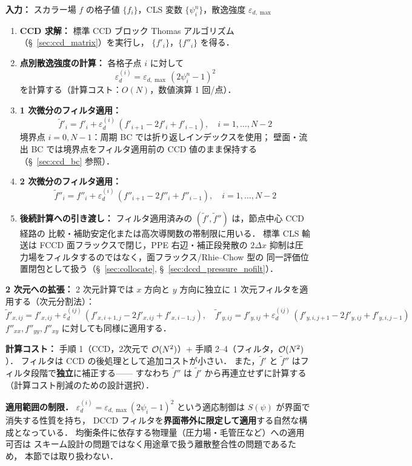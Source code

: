\begin{tcolorbox}[algbox, title={適応 Dissipative-CCD フィルタの節点中心評価手順}]
\label{alg:dccd}
\textbf{入力：} スカラー場 $f$ の格子値 $\{f_i\}$，CLS 変数 $\{\psi_i^n\}$，散逸強度 $\varepsilon_{d,\max}$

\begin{enumerate}
  \item \textbf{CCD 求解：}
        標準 CCD ブロック Thomas アルゴリズム（§~\ref{sec:ccd_matrix}）を実行し，
        $\{f'_i\}$，$\{f''_i\}$ を得る．
  \item \textbf{点別散逸強度の計算：}
        各格子点 $i$ に対して
        \[
          \varepsilon_d^{(i)} = \varepsilon_{d,\max}\,(2\psi_i^n - 1)^2
        \]
        を計算する（計算コスト：$O(N)$，数値演算 1 回/点）．
  \item \textbf{1 次微分のフィルタ適用：}
        \[
          \tilde{f}'_i = f'_i + \varepsilon_d^{(i)}\,(f'_{i+1} - 2f'_i + f'_{i-1}),
          \quad i = 1, \ldots, N-2
        \]
        境界点 $i=0, N-1$：周期 BC では折り返しインデックスを使用；
        壁面・流出 BC では境界点をフィルタ適用前の CCD 値のまま保持する（§~\ref{sec:ccd_bc} 参照）．
  \item \textbf{2 次微分のフィルタ適用：}
        \[
          \tilde{f}''_i = f''_i + \varepsilon_d^{(i)}\,(f''_{i+1} - 2f''_i + f''_{i-1}),
          \quad i = 1, \ldots, N-2
        \]
  \item \textbf{後続計算への引き渡し：}
        フィルタ適用済みの $(\tilde{f}', \tilde{f}'')$ は，節点中心 CCD 経路の
        比較・補助安定化または高次導関数の帯制限に用いる．
        標準 CLS 輸送は FCCD 面フラックスで閉じ，PPE 右辺・補正段発散の
        $2\Delta x$ 抑制は圧力場をフィルタするのではなく，面フラックス/Rhie--Chow 型の
        同一評価位置閉包として扱う（§~\ref{sec:collocate}, §~\ref{sec:dccd_pressure_nofilt}）．
\end{enumerate}

\textbf{2 次元への拡張：}
2 次元計算では $x$ 方向と $y$ 方向に独立に 1 次元フィルタを適用する（次元分割法）：
\[
  \tilde{f}'_{x,ij} = f'_{x,ij} + \varepsilon_d^{(ij)}\,(f'_{x,i+1,j} - 2f'_{x,ij} + f'_{x,i-1,j}),
  \quad
  \tilde{f}'_{y,ij} = f'_{y,ij} + \varepsilon_d^{(ij)}\,(f'_{y,i,j+1} - 2f'_{y,ij} + f'_{y,i,j-1})
\]
$f''_{xx}, f''_{yy}, f''_{xy}$ に対しても同様に適用する．

\textbf{計算コスト：} 手順 1（CCD，2次元で $\mathcal{O}(N^2)$）+ 手順 2--4（フィルタ，$\mathcal{O}(N^2)$）．
フィルタは CCD の後処理として追加コストが小さい．
また，$\tilde{f}'$ と $\tilde{f}''$ はフィルタ段階で\textbf{独立}に補正する——
すなわち $\tilde{f}''$ は $\tilde{f}'$ から再連立せずに計算する（計算コスト削減のための設計選択）．
\end{tcolorbox}

\noindent\textbf{適用範囲の制限．}
$\varepsilon_d^{(i)} = \varepsilon_{d,\max}(2\psi_i-1)^2$ という適応制御は
$S(\psi)$ が界面で消失する性質を持ち，
DCCD フィルタを\textbf{界面帯外に限定して適用}する自然な構成となっている．
均衡条件に依存する物理量（圧力場・毛管圧など）への適用可否は
スキーム設計の問題ではなく用途章で扱う離散整合性の問題であるため，
本節では取り扱わない．

